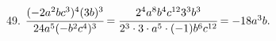 49. $\cfrac{(-2a^2bc^3)^4(3b)^3}{24a^5(-b^2c^4)^3}=\cfrac{2^4 a^8 b^4 c^{12}3^3 b^3}{2^3\cdot 3 \cdot a^5\cdot(-1)b^6c^{12}}=-18a^3b.$\\
